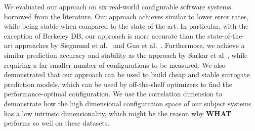 \documentclass[smallextended]{svjour3}       %
\newcommand{\tion}[1]{\S\ref{sect:#1}}
\newcommand{\what}{{\bf WHAT}\xspace}
\begin{document}
We evaluated our approach on six real-world configurable software systems borrowed from the
literature. Our approach achieves similar to lower error rates, while being stable when
compared to the state of the art. In particular, with the exception of Berkeley DB, our
approach is more accurate than the state-of-the-art approaches by Siegmund et
al.~\cite{siegmund2012predicting} and Guo et al.~\cite{guo2013variability}. Furthermore, we
achieve a similar prediction accuracy and stability as the approach by Sarkar et
al~\cite{sarkar2015cost}, while requiring a far smaller number of configurations to be
measured. We also demonstrated that our approach can be used to build cheap and stable
surrogate prediction models, which can be used by off-the-shelf optimizers to find the
performance-optimal configuration.  We use the correlation dimension to demonstrate how the high dimensional configuration space of our subject systems has a low intrinsic dimensionality, which might be the reason why \what performs so well on these datasets. 






  
\end{document}
